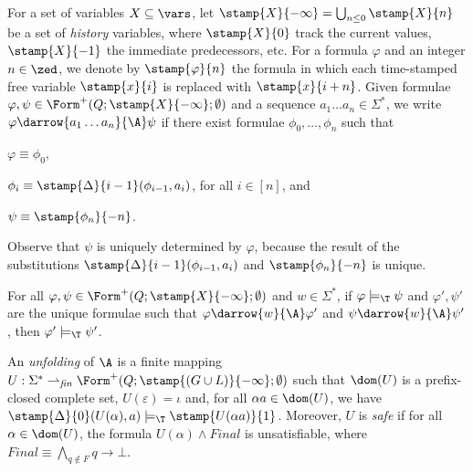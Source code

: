For a set of variables $X \subseteq \vars$, let $\stamp{X}{-\infty} =
\bigcup_{n\leq0} \stamp{X}{n}$ be a set of \emph{history} variables,
where $\stamp{X}{0}$ track the current values, $\stamp{X}{-1}$ the
immediate predecessors, etc. For a formula $\varphi$ and an integer $n
\in \zed$, we denote by $\stamp{\varphi}{n}$ the formula in which each
time-stamped free variable $\stamp{x}{i}$ is replaced with
$\stamp{x}{i+n}$. Given formulae $\varphi,\psi \in
\Form^+(Q;\stamp{X}{-\infty}; \emptyset)$ and a sequence $a_1 \ldots
a_n \in \Sigma^*$, we write $\varphi \darrow{a_1 \ldots a_n}{\A} \psi$
if there exist formulae $\phi_0, \ldots, \phi_n$ such
that\begin{inparaenum}[(i)]
\item $\varphi \equiv \phi_0$, 
\item $\phi_i \equiv \stamp{\Delta}{i-1}(\phi_{i-1},a_i)$, for all $i
  \in [n]$, and
\item $\psi \equiv \stamp{\phi_n}{-n}$. \end{inparaenum} Observe that
$\psi$ is uniquely determined by $\varphi$, because the result of the
substitutions $\stamp{\Delta}{i-1}(\phi_{i-1},a_i)$ and
$\stamp{\phi_n}{-n}$ is unique.

\begin{proposition}\label{prop:monotonicity}
  For all $\varphi,\psi \in \Form^+(Q;\stamp{X}{-\infty}; \emptyset)$
  and $w \in \Sigma^*$, if $\varphi \models_\T \psi$ and $\varphi',
  \psi'$ are the unique formulae such that $\varphi \darrow{w}{\A}
  \varphi'$ and $\psi \darrow{w}{\A} \psi'$, then $\varphi' \models_\T
  \psi'$.
\end{proposition}

\begin{definition}\label{def:unfolding}
An \emph{unfolding} of $\A$ is a finite mapping $U : \Sigma^*
\rightharpoonup_{\mathit{fin}} \Form^+(Q;\stamp{(G\cup L)}{-\infty};
\emptyset)$ such that $\dom(U)$ is a prefix-closed complete set,
$U(\varepsilon) = \iota$ and, for all $\alpha a \in \dom(U)$, we have
$\stamp{\Delta}{0}(U(\alpha),a) \models_\T \stamp{U(\alpha a)}{1}$.
Moreover, $U$ is \emph{safe} if for all $\alpha \in \dom(U)$, the
formula $U(\alpha) \wedge \mathit{Final}$ is unsatisfiable, where
$\mathit{Final} \equiv \bigwedge_{q \not\in F} q \rightarrow \bot$.
\end{definition}

